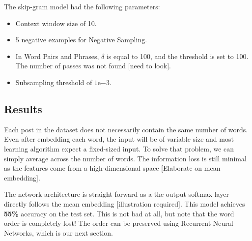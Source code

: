 The skip-gram model had the following parameters:
\begin{itemize}
    \item Context window size of 10.
    \item 5 negative examples for Negative Sampling.
    \item In Word Pairs and Phrases, $\delta$ is equal to 100, and the threshold is set to 100. The number of passes was not found [need to look].
    \item Subsampling threshold of $1\mathrm{e}{-3}.$
\end{itemize}

\subsection{Results}
Each post in the dataset does not necessarily contain the same number of words. Even after embedding each word, the input will be of variable size and most learning algorithm expect a fixed-sized input. To solve that problem, we can simply average across the number of words. The information loss is still minimal as the features come from a high-dimensional space [Elaborate on mean embedding].

The network architecture is straight-forward as a the output softmax layer directly follows the mean embedding [illustration required]. This model achieves \textbf{55\%} accuracy on the test set. This is not bad at all, but note that the word order is completely lost! The order can be preserved using Recurrent Neural Networks, which is our next section.





